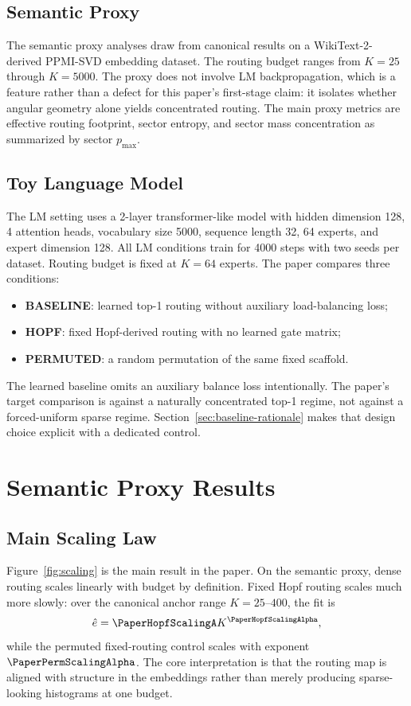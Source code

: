 \documentclass[10pt,twocolumn]{article}
\begin{document}
\subsection{Semantic Proxy}
The semantic proxy analyses draw from canonical results on a WikiText-2-derived PPMI-SVD embedding dataset. The routing budget ranges from $K=25$ through $K=5000$. The proxy does not involve LM backpropagation, which is a feature rather than a defect for this paper's first-stage claim: it isolates whether angular geometry alone yields concentrated routing. The main proxy metrics are effective routing footprint, sector entropy, and sector mass concentration as summarized by sector $p_{\max}$.

\subsection{Toy Language Model}
The LM setting uses a 2-layer transformer-like model with hidden dimension 128, 4 attention heads, vocabulary size 5000, sequence length 32, 64 experts, and expert dimension 128. All LM conditions train for 4000 steps with two seeds per dataset. Routing budget is fixed at $K=64$ experts. The paper compares three conditions:
\begin{itemize}
\item \textbf{BASELINE}: learned top-1 routing without auxiliary load-balancing loss;
\item \textbf{HOPF}: fixed Hopf-derived routing with no learned gate matrix;
\item \textbf{PERMUTED}: a random permutation of the same fixed scaffold.
\end{itemize}

The learned baseline omits an auxiliary balance loss intentionally. The paper's target comparison is against a naturally concentrated top-1 regime, not against a forced-uniform sparse regime. Section~\ref{sec:baseline-rationale} makes that design choice explicit with a dedicated control.

\section{Semantic Proxy Results}
\subsection{Main Scaling Law}
Figure~\ref{fig:scaling} is the main result in the paper. On the semantic proxy, dense routing scales linearly with budget by definition. Fixed Hopf routing scales much more slowly: over the canonical anchor range $K=25$--$400$, the fit is
\[
\hat{e} = \PaperHopfScalingA K^{\PaperHopfScalingAlpha},
\]
while the permuted fixed-routing control scales with exponent $\PaperPermScalingAlpha$. The core interpretation is that the routing map is aligned with structure in the embeddings rather than merely producing sparse-looking histograms at one budget.
\end{document}
